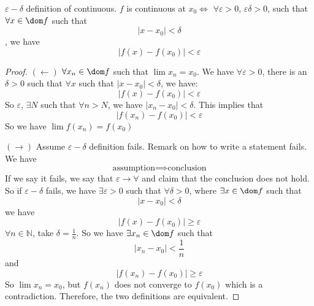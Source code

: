 \documentclass{report}
\begin{document}
\begin{theorem}{17.2}
    $\varepsilon-\delta$ definition of continuous. $f$ is continuous at $x_{0} \iff $ $\forall \varepsilon > 0$, $\varepsilon\delta > 0$, such that $\forall x \in \dom f$ such that 
        \begin{equation*}
            \lvert x - x_{0} \rvert < \delta
        \end{equation*}, 
    we have
        \begin{equation*}
            \lvert f(x) - f(x_{0}) \rvert < \varepsilon
        \end{equation*}
\end{theorem}
    \begin{proof}
        $(\leftarrow )$ $\forall x_{n} \in \dom f$ such that $\lim x_{n} = x_{0}$. We have $\forall \varepsilon > 0$, there is an $\delta > 0$ such that $\forall x$ such that $\lvert x - x_{0} \rvert < \delta$, we have:
            \begin{equation*}
                \lvert f(x) - f(x_{0}) \rvert < \varepsilon
            \end{equation*}
        So $\varepsilon$, $\exists N$ such that $\forall n > N$, we have $\lvert x_{n} - x_{0} \rvert < \delta$. This implies that 
            \begin{equation*}
                \lvert f(x_{n}) - f(x_{0}) \rvert < \varepsilon
            \end{equation*}
        So we have $\lim f(x_{n}) = f(x_{0})$

        $(\rightarrow )$ Assume $\varepsilon-\delta$ definition fails. Remark on how to write a statement fails. We have
            \begin{equation*}
                \text{assumption} \implies \text{conclusion}
            \end{equation*}
        If we say it fails, we say that $\varepsilon \rightarrow \forall $ and claim that the conclusion does not hold. So if $\varepsilon-\delta$ fails, we have $\exists \varepsilon > 0$ such that $\forall \delta > 0$, where $\exists x \in \dom f$ such that
            \begin{equation*}
                \lvert x - x_{0} \rvert < \delta
            \end{equation*}
        we have
            \begin{equation*}
                \lvert f(x) - f(x_{0}) \rvert \geq \varepsilon
            \end{equation*}
        $\forall n \in \mathbb{N}$, take $\delta = \frac{1}{n}$. So we have $\exists x_{n} \in \dom f$ such that
            \begin{equation*}
                \lvert x_{n} - x_{0} \rvert < \dfrac{1}{n}
            \end{equation*}
        and 
            \begin{equation*}
                \lvert f(x_{n}) - f(x_{0}) \rvert \geq \varepsilon
            \end{equation*}
        So $\lim x_{n} = x_{0}$, but $f(x_{n})$ does not converge to $f(x_{0})$ which is a contradiction. Therefore, the two definitions are equivalent. 
    \end{proof}
\end{document}
